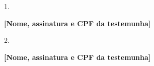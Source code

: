 \begin{anexosenv}
\begin{center}
	1. \hrulefill \par
	\textbf{[Nome, assinatura e CPF da testemunha]} \par
	\vspace{1cm}
	
	2. \hrulefill \par
	\textbf{[Nome, assinatura e CPF da testemunha]} \par
\end{center}
\end{anexosenv}

